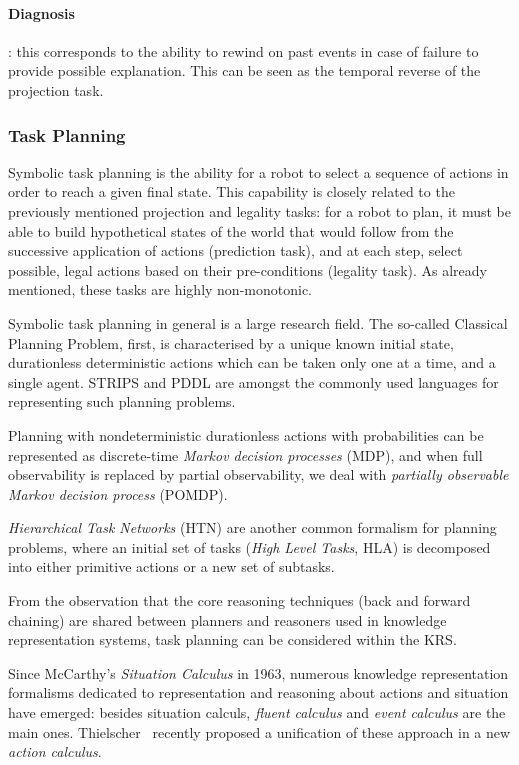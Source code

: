 \documentclass[a4paper, twocolumn]{article}
\begin{document}
\paragraph{Diagnosis}: this corresponds to the ability to rewind on past events
in case of failure to provide possible explanation. This can be seen as the
temporal reverse of the projection task.

\subsubsection{Task Planning}
\label{sect|planning}

Symbolic task planning is the ability for a robot to select a sequence of
actions in order to reach a given final state. This capability is closely
related to the previously mentioned projection and legality tasks: for a robot
to plan, it must be able to build hypothetical states of the world that would
follow from the successive application of actions (prediction task), and at
each step, select possible, legal actions based on their pre-conditions
(legality task). As already mentioned, these tasks are highly non-monotonic.


Symbolic task planning in general is a large research
field\cite{Russell2009planning}. The so-called Classical Planning Problem,
first, is characterised by a unique known initial state, durationless
deterministic actions which can be taken only one at a time, and a single
agent. STRIPS and PDDL are amongst the commonly used languages for representing
such planning problems.

Planning with nondeterministic durationless actions with probabilities can be
represented as discrete-time \emph{Markov decision processes} (MDP), and when
full observability is replaced by partial observability, we deal with
\emph{partially observable Markov decision process} (POMDP).

\emph{Hierarchical Task Networks} (HTN) are another common formalism for
planning problems, where an initial set of tasks (\emph{High Level Tasks}, HLA)
is decomposed into either primitive actions or a new set of subtasks.

From the observation that the core reasoning techniques (back and forward
chaining) are shared between planners and reasoners used in knowledge
representation systems, task planning can be considered within the KRS.

Since McCarthy's \emph{Situation Calculus} in 1963, numerous knowledge
representation formalisms dedicated to representation and reasoning about
actions and situation have emerged: besides situation calculs, \emph{fluent
calculus} and \emph{event calculus} are the main ones.
Thielscher~\cite{Thielscher2011} recently proposed a unification of these
approach in a new \emph{action calculus}.
\end{document}
